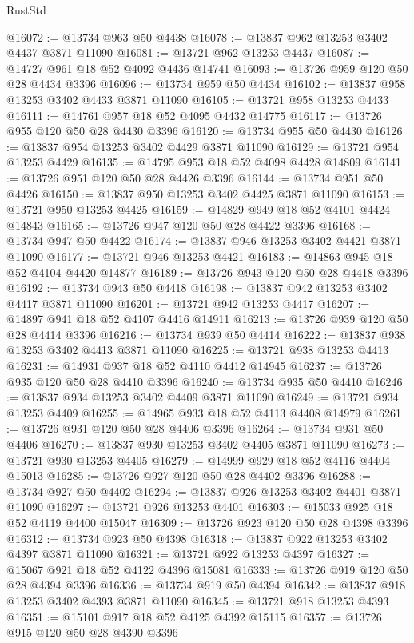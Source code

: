 \begin{lexlean}{RustStd}
\begin{coremodule}
@16072 := @13734 @963 @50 @4438
@16078 := @13837 @962 @13253 @3402 @4437 @3871 @11090
@16081 := @13721 @962 @13253 @4437
@16087 := @14727 @961 @18 @52 @4092 @4436 @14741
@16093 := @13726 @959 @120 @50 @28 @4434 @3396
@16096 := @13734 @959 @50 @4434
@16102 := @13837 @958 @13253 @3402 @4433 @3871 @11090
@16105 := @13721 @958 @13253 @4433
@16111 := @14761 @957 @18 @52 @4095 @4432 @14775
@16117 := @13726 @955 @120 @50 @28 @4430 @3396
@16120 := @13734 @955 @50 @4430
@16126 := @13837 @954 @13253 @3402 @4429 @3871 @11090
@16129 := @13721 @954 @13253 @4429
@16135 := @14795 @953 @18 @52 @4098 @4428 @14809
@16141 := @13726 @951 @120 @50 @28 @4426 @3396
@16144 := @13734 @951 @50 @4426
@16150 := @13837 @950 @13253 @3402 @4425 @3871 @11090
@16153 := @13721 @950 @13253 @4425
@16159 := @14829 @949 @18 @52 @4101 @4424 @14843
@16165 := @13726 @947 @120 @50 @28 @4422 @3396
@16168 := @13734 @947 @50 @4422
@16174 := @13837 @946 @13253 @3402 @4421 @3871 @11090
@16177 := @13721 @946 @13253 @4421
@16183 := @14863 @945 @18 @52 @4104 @4420 @14877
@16189 := @13726 @943 @120 @50 @28 @4418 @3396
@16192 := @13734 @943 @50 @4418
@16198 := @13837 @942 @13253 @3402 @4417 @3871 @11090
@16201 := @13721 @942 @13253 @4417
@16207 := @14897 @941 @18 @52 @4107 @4416 @14911
@16213 := @13726 @939 @120 @50 @28 @4414 @3396
@16216 := @13734 @939 @50 @4414
@16222 := @13837 @938 @13253 @3402 @4413 @3871 @11090
@16225 := @13721 @938 @13253 @4413
@16231 := @14931 @937 @18 @52 @4110 @4412 @14945
@16237 := @13726 @935 @120 @50 @28 @4410 @3396
@16240 := @13734 @935 @50 @4410
@16246 := @13837 @934 @13253 @3402 @4409 @3871 @11090
@16249 := @13721 @934 @13253 @4409
@16255 := @14965 @933 @18 @52 @4113 @4408 @14979
@16261 := @13726 @931 @120 @50 @28 @4406 @3396
@16264 := @13734 @931 @50 @4406
@16270 := @13837 @930 @13253 @3402 @4405 @3871 @11090
@16273 := @13721 @930 @13253 @4405
@16279 := @14999 @929 @18 @52 @4116 @4404 @15013
@16285 := @13726 @927 @120 @50 @28 @4402 @3396
@16288 := @13734 @927 @50 @4402
@16294 := @13837 @926 @13253 @3402 @4401 @3871 @11090
@16297 := @13721 @926 @13253 @4401
@16303 := @15033 @925 @18 @52 @4119 @4400 @15047
@16309 := @13726 @923 @120 @50 @28 @4398 @3396
@16312 := @13734 @923 @50 @4398
@16318 := @13837 @922 @13253 @3402 @4397 @3871 @11090
@16321 := @13721 @922 @13253 @4397
@16327 := @15067 @921 @18 @52 @4122 @4396 @15081
@16333 := @13726 @919 @120 @50 @28 @4394 @3396
@16336 := @13734 @919 @50 @4394
@16342 := @13837 @918 @13253 @3402 @4393 @3871 @11090
@16345 := @13721 @918 @13253 @4393
@16351 := @15101 @917 @18 @52 @4125 @4392 @15115
@16357 := @13726 @915 @120 @50 @28 @4390 @3396

\end{coremodule}
\end{lexlean}
